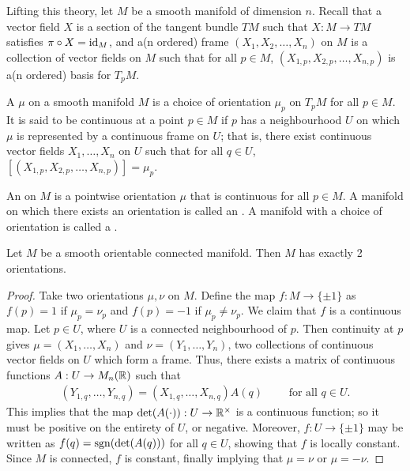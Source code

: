 Lifting this theory, let $M$ be a smooth manifold of dimension $n$. Recall that a vector field $X$ is a section of the tangent bundle $TM$ such that $X:M \to TM$ satisfies $\pi \circ X = \operatorname{id}_{M}$, and a(n ordered) frame $(X_{1},X_{2},\ldots,X_{n})$ on $M$ is a collection of vector fields on $M$ such that for all $p \in M$, $(X_{1,p},X_{2,p},\ldots,X_{n,p})$ is a(n ordered) basis for $T_{p}M$.

\begin{definition}
    A  $\mu$ on a smooth manifold $M$ is a choice of orientation $\mu_{p}$ on $T_{p}M$ for all $p \in M$. It is said to be continuous at a point $p \in M$ if $p$ has a neighbourhood $U$ on which $\mu$ is represented by a continuous frame on $U$; that is, there exist continuous vector fields $X_{1},\ldots,X_{n}$ on $U$ such that for all $q \in U$, $[(X_{1,p},X_{2,p},\ldots,X_{n,p})] = \mu_{p}$.

    An  on $M$ is a pointwise orientation $\mu$ that is continuous for all $p \in M$. A manifold on which there exists an orientation is called an . A manifold with a choice of orientation is called a .
\end{definition}

\begin{proposition}
    Let $M$ be a smooth orientable connected manifold. Then $M$ has exactly 2 orientations.
\end{proposition}
\begin{proof}
    Take two orientations $\mu,\nu$ on $M$. Define the map $f:M \to \{\pm 1\}$ as $f(p) = 1$ if $\mu_{p} = \nu_{p}$ and $f(p) = -1$ if $\mu_{p} \neq \nu_{p}$. We claim that $f$ is a continuous map. Let $p \in U$, where $U$ is a connected neighbourhood of $p$. Then continuity at $p$ gives $\mu = (X_{1},\ldots,X_{n})$ and $\nu = (Y_{1},\ldots,Y_{n})$, two collections of continuous vector fields on $U$ which form a frame. Thus, there exists a matrix of continuous functions $A:U \to M_{n}(\mathbb{R})$ such that
    \begin{align}
        (Y_{1,q},\ldots,Y_{n,q}) = (X_{1,q},\ldots,X_{n,q})A(q) \qquad \text{ for all } q \in U.
    \end{align}
    This implies that the map $\det(A(\cdot)):U \to \mathbb{R}^{\times}$ is a continuous function; so it must be positive on the entirety of $U$, or negative. Moreover, $f:U \to \{\pm 1\}$ may be written as $f(q) = \operatorname{sgn}(\det(A(q)))$ for all $q \in U$, showing that $f$ is locally constant. Since $M$ is connected, $f$ is constant, finally implying that $\mu = \nu$ or $\mu = -\nu$.
\end{proof}

